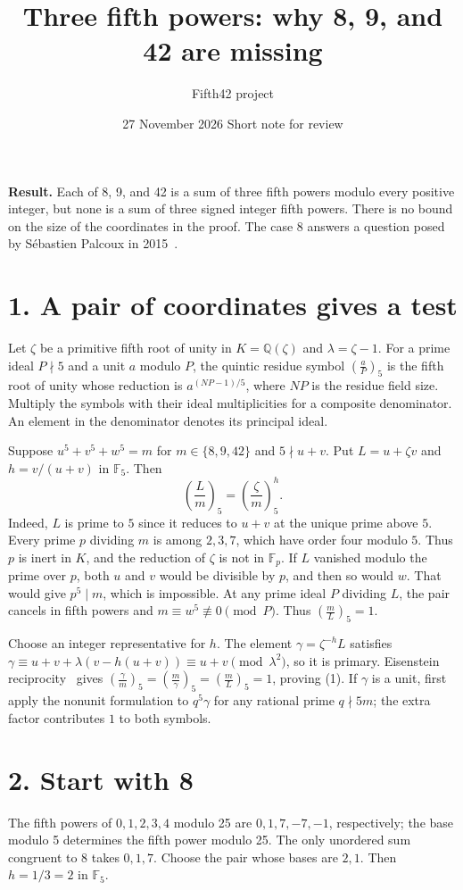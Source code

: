\documentclass[10pt]{article}
\title{Three fifth powers: why 8, 9, and 42 are missing}
\author{Fifth42 project}
\date{27 November 2026 \quad\textbar\quad Short note for review}
\newcommand{\F}{\mathbb F}
\newcommand{\Q}{\mathbb Q}
\newcommand{\sym}[2]{\left(\frac{#1}{#2}\right)_5}
\begin{document}
\maketitle
\vspace{-1.7em}
\textbf{Result.} Each of 8, 9, and 42 is a sum of three fifth powers modulo
every positive integer, but none is a sum of three signed integer fifth
powers. There is no bound on the size of the coordinates in the proof.
The case 8 answers a question posed by S\'ebastien Palcoux in 2015~\cite{palcoux}.

\section*{1. A pair of coordinates gives a test}
Let $\zeta$ be a primitive fifth root of unity in $K=\Q(\zeta)$ and
$\lambda=\zeta-1$. For a prime ideal $P\nmid 5$ and a unit $a$ modulo $P$,
the quintic residue symbol $\sym{a}{P}$ is the fifth root of unity whose
reduction is $a^{(NP-1)/5}$, where $NP$ is the residue field size.
Multiply the symbols with their ideal multiplicities for a composite
denominator. An element in the denominator denotes its principal ideal.

Suppose $u^5+v^5+w^5=m$ for $m\in\{8,9,42\}$ and $5\nmid u+v$.
Put $L=u+\zeta v$ and $h=v/(u+v)$ in $\F_5$. Then
\begin{equation}
  \sym{L}{m}=\sym{\zeta}{m}^{h}. \tag{1}
\end{equation}
Indeed, $L$ is prime to $5$ since it reduces to $u+v$ at the unique prime
above $5$. Every prime $p$ dividing $m$ is among $2,3,7$, which have order
four modulo $5$. Thus $p$ is inert in $K$, and the reduction of $\zeta$ is
not in $\F_p$. If $L$ vanished modulo the prime over $p$, both $u$ and $v$
would be divisible by $p$, and then so would $w$. That would give $p^5\mid m$,
which is impossible. At any prime ideal $P$ dividing $L$, the pair cancels
in fifth powers and $m\equiv w^5\not\equiv0\pmod P$. Thus $\sym{m}{L}=1$.

Choose an integer representative for $h$. The element
$\gamma=\zeta^{-h}L$ satisfies
$\gamma\equiv u+v+\lambda(v-h(u+v))\equiv u+v\pmod{\lambda^2}$,
so it is primary. Eisenstein reciprocity~\cite[Eq.~(1.1)]{sw} gives
$\sym{\gamma}{m}=\sym{m}{\gamma}=\sym{m}{L}=1$, proving (1).
If $\gamma$ is a unit, first apply the nonunit formulation to $q^5\gamma$
for any rational prime $q\nmid 5m$; the extra factor contributes $1$ to
both symbols.

\section*{2. Start with 8}
The fifth powers of $0,1,2,3,4$ modulo 25 are $0,1,7,-7,-1$,
respectively; the base modulo 5 determines the fifth power modulo 25.
The only unordered sum congruent to 8 takes $0,1,7$. Choose the pair whose
bases are $2,1$. Then $h=1/3=2$ in $\F_5$.
\end{document}
